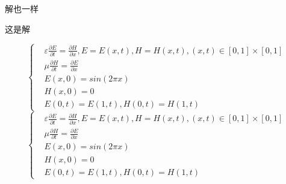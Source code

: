 \begin{example}
解也一样

\begin{solution}
这是解
\end{solution}

\end{example}


\[
\left \{
\begin{aligned}
&\varepsilon \frac{\partial E}{\partial t}=\frac{\partial H}{\partial x},
E=E\left ( x,t \right ),H=H\left ( x,t \right ),\left ( x,t \right )\in \left [ 0,1 \right ]\times \left[ 0,1 \right ]\\
&\mu \frac{\partial H}{\partial t}=\frac{\partial E}{\partial x} \\
&E\left ( x,0 \right )=sin\left ( 2\pi x \right )\\
&H\left ( x,0 \right )=0\\
&E\left ( 0,t \right )=E\left ( 1,t \right ),H\left ( 0,t \right )=H\left ( 1,t \right )
\end{aligned}
\right.
\]\[
\left \{
\begin{aligned}
&\varepsilon \frac{\partial E}{\partial t}=\frac{\partial H}{\partial x},
E=E\left ( x,t \right ),H=H\left ( x,t \right ),\left ( x,t \right )\in \left [ 0,1 \right ]\times \left[ 0,1 \right ]\\
&\mu \frac{\partial H}{\partial t}=\frac{\partial E}{\partial x} \\
&E\left ( x,0 \right )=sin\left ( 2\pi x \right )\\
&H\left ( x,0 \right )=0\\
&E\left ( 0,t \right )=E\left ( 1,t \right ),H\left ( 0,t \right )=H\left ( 1,t \right )
\end{aligned}
\right.
\]
